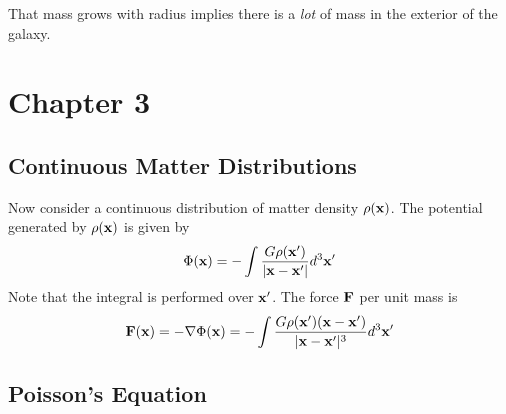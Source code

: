 \documentclass[]{article}
\begin{document}
That mass grows with radius implies there is a {\it lot}
of mass in the exterior of the galaxy.


\section{Chapter 3}

\subsection{Continuous Matter Distributions}
Now consider a continuous distribution of matter density $\rho(\mathbf{x})$.  The
potential generated by $\rho(\mathbf{x})$ is given by
\begin{equation}
\label{eqn:potential}
\Phi(\mathbf{x}) = - \int \frac{G\rho(\mathbf{x}')}{|\mathbf{x} - \mathbf{x}'|}d^{3}\mathbf{x}'
\end{equation}
\noindent
Note that the integral is performed over $\mathbf{x}'$.  The force $\mathbf{F}$ per unit mass
is
\begin{equation}
\mathbf{F}(\mathbf{x}) = - \nabla \Phi(\mathbf{x}) = - \int \frac{G\rho(\mathbf{x}')(\mathbf{x}-\mathbf{x}')}{|\mathbf{x}-\mathbf{x}'|^{3}}d^{3}\mathbf{x}'
\end{equation}

\subsection{Poisson's Equation}
\end{document}
